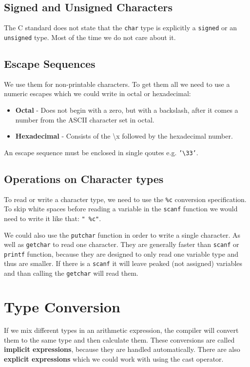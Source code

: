 \documentclass[openany]{book}
\begin{document}
    \subsection*{Signed and Unsigned Characters}
    The C standard does not state that the \texttt{char} type is explicitly a \texttt{signed} or an \texttt{unsigned} type. Most of the time we do not care about it.

    \subsection*{Escape Sequences}
    We use them for non-printable characters. To get them all we need to use a numeric escapes which we could write in octal or hexadecimal:
    \begin{itemize}
        \item \textbf{Octal} - Does not begin with a zero, but with a backslash, after it  comes a number from the ASCII character set in octal.
        \item \textbf{Hexadecimal} - Consists of the \textbackslash x followed by the hexadecimal number.
    \end{itemize}
    An escape sequence must be enclosed in single qoutes e.g. \texttt{'\textbackslash 33'}.

    \subsection*{Operations on Character types}
    To read or write a character type, we need to use the \texttt{\%c} conversion specification. To skip white spaces before reading a variable in the \texttt{scanf} function we would need to write it like that: \texttt{" \%c"}.

    \bigskip

    We could also use the \texttt{putchar} function in order to write a single character. As well as \texttt{getchar} to read one character. They are generally faster than \texttt{scanf} or \texttt{printf} function, because they are designed to only read one variable type and thus are smaller. If there is a \texttt{scanf} it will leave peaked (not assigned) variables and than calling the \texttt{getchar} will read them.

    \section{Type Conversion}
    If we mix different types in an arithmetic expression, the compiler will convert them to the same type and then calculate them. These conversions are called \textbf{implicit expressions}, because they are handled automatically. There are also \textbf{explicit expressions} which we could work with using the cast operator.
\end{document}
